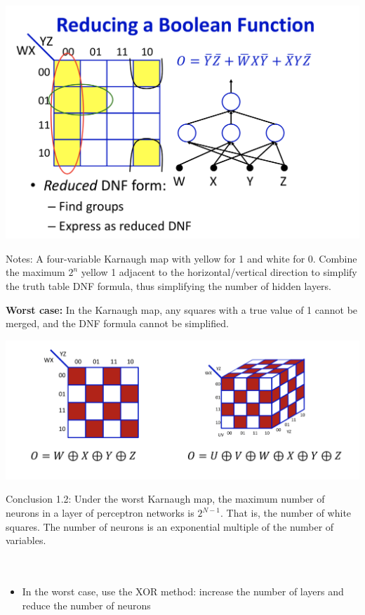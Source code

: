 \documentclass{article}
\begin{document}
	\includegraphics[scale=0.2]{15.png}
	
	Notes: A four-variable Karnaugh map with yellow for 1 and white for 0. Combine the maximum $2^n$ yellow 1 adjacent to the horizontal/vertical direction to simplify the truth table DNF formula, thus simplifying the number of hidden layers.
	
	\textbf{Worst case:} In the Karnaugh map, any squares with a true value of 1 cannot be merged, and the DNF formula cannot be simplified.
	
	
	\includegraphics[scale=0.2]{16.png}
	
	Conclusion 1.2: Under the worst Karnaugh map, the maximum number of neurons in a layer of perceptron networks is $2^{N-1}$. That is, the number of white squares. The number of neurons is an exponential multiple of the number of variables. \\ \\ \\
	
	
	\begin{itemize}
		\item In the worst case, use the XOR method: increase the number of layers and reduce the number of neurons
	\end{itemize}
	
\end{document}
